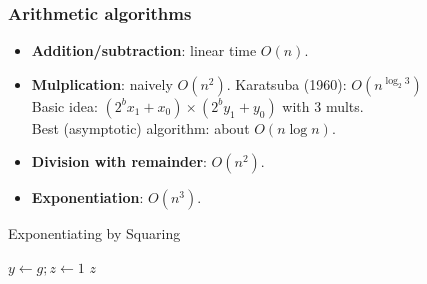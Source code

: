 \begin{comment}
Convert $(x_p,x_q)$ to its representation modulo $N$:
\begin{enumerate}
\item Compute $X,Y$ such that $Xp+Yq=1$.
\item $1_p = [Yq \bmod N]$ and $1_q = [Xp \bmod N]$.
\item Compute $x = [(x_p\cdot 1_p+x_q\cdot 1_q) \bmod N]$.
\end{enumerate}
\begin{exampleblock}{Find the representation of $([4 \bmod 5],[3 \bmod 7])$ modulo $35$.}
Use extended Euclidean algorithm, $3\cdot 5-2\cdot 7 =1$.\\
$1_p = [(-2\cdot 7) \bmod 35]=21$ and $1_q = [3\cdot 5 \bmod 35] = 15$.\\
$(4,3) \leftrightarrow [4\cdot 1_p + 3\cdot 1_q \bmod 35] = 24$.
\end{exampleblock}
\begin{exampleblock}{Compute $[29^{100} \bmod 35]$}
$29 \leftrightarrow ([1 \bmod 5],[-1 \bmod 7])$, $[29^{100} \bmod 35] \leftrightarrow (1,-1)^{100} = (1,1) \leftrightarrow 1$.
\end{exampleblock}
\end{frame}
\end{comment}
\begin{frame}\frametitle{Arithmetic algorithms}
\begin{itemize}
\item \textbf{Addition/subtraction}: linear time $O(n)$.
\item \textbf{Mulplication}: naively $O(n^2)$. Karatsuba (1960): $O(n^{\log_2 3})$\\
Basic idea: $(2^bx_1+x_0) \times (2^by_1+ y_0)$ with 3 mults.\\
Best (asymptotic) algorithm: about $O(n\log n)$.
\item \textbf{Division with remainder}: $O(n^2)$.
\item \textbf{Exponentiation}: $O(n^3)$.
\end{itemize}
\begin{algorithm}[H]
\DontPrintSemicolon
\caption{Exponentiating by Squaring}
\BlankLine
$y \gets g; z \gets 1$\;
\Return $z$
\end{algorithm}
\end{frame}

